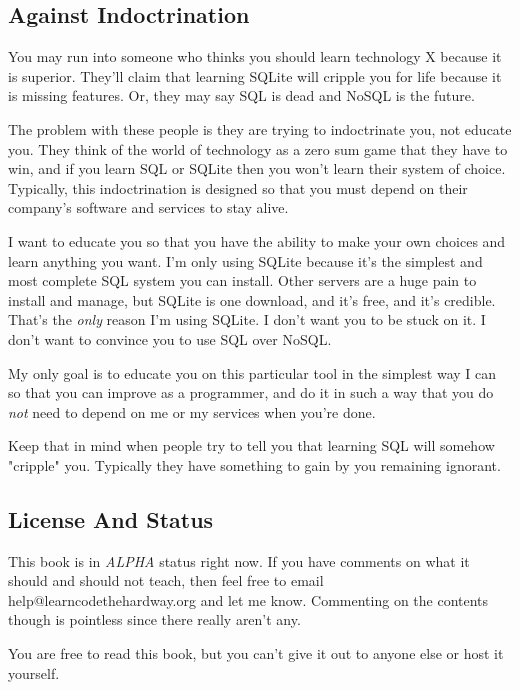 \subsection*{Against Indoctrination}

You may run into someone who thinks you should learn technology X because 
it is superior.  They'll claim that learning SQLite will cripple you for
life because it is missing features.  Or, they may say SQL is dead and
NoSQL is the future.

The problem with these people is they are trying to indoctrinate you, not
educate you.  They think of the world of technology as a zero sum game
that they have to win, and if you learn SQL or SQLite then you won't
learn their system of choice.  Typically, this indoctrination is designed
so that you must depend on their company's software and services to 
stay alive.

I want to educate you so that you have the ability to make your own choices and
learn anything you want.  I'm only using SQLite because it's the simplest and
most complete SQL system you can install.  Other servers are a huge pain to
install and manage, but SQLite is one download, and it's free, and it's
credible. That's the \emph{only} reason I'm using SQLite.  I don't want you to
be stuck on it.  I don't want to convince you to use SQL over NoSQL.

My only goal is to educate you on this particular tool in the simplest way
I can so that you can improve as a programmer, and do it in such a way that
you do \emph{not} need to depend on me or my services when you're done.

Keep that in mind when people try to tell you that learning SQL will somehow
"cripple" you.  Typically they have something to gain by you remaining
ignorant.

\subsection*{License And Status}

This book is in \emph{ALPHA} status right now.  If you have comments on what it
should and should not teach, then feel free to email help@learncodethehardway.org
and let me know.  Commenting on the contents though is pointless since there
really aren't any.

You are free to read this book, but you can't give it out to anyone else or
host it yourself.


